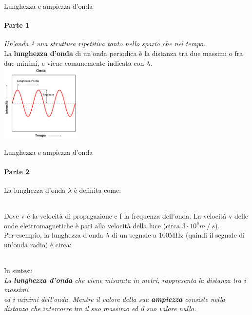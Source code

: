 \documentclass[aspectratio=169]{beamer}
\newcommand*{\vet}{\fontfamily{qzc}\selectfont}
\begin{document}
\begin{frame}{Lunghezza e ampiezza d'onda}
	\framesubtitle{Parte 1}
	\emph{Un'onda è una struttura ripetitiva tanto nello spazio che nel tempo.}\\
	\smallskip
	La \textbf{lunghezza d'onda} di un'onda periodica è la distanza tra due massimi o fra due minimi, e viene comunemente indicata con $\lambda$.\\
	\centering
	\includegraphics[width=0.3\textwidth]{Imgs/Onda}
\end{frame}

\begin{frame}{Lunghezza e ampiezza d'onda}
	\framesubtitle{Parte 2}
	La lunghezza d'onda $\lambda$ è definita come:\\
	\medskip
	\centering{$\lambda = \frac{{\vet v}}{{\vet f}}$}\\
	\smallskip
	\raggedright{Dove {\vet v} è la velocità di propagazione e {\vet f} la frequenza dell'onda. La velocità {\vet v} delle onde elettromagnetiche è pari alla velocità della luce (circa $3 \cdot 10^8 m\mathbin{/}s$)}.\\
	\medskip
	Per esempio, la lunghezza d'onda $\lambda$ di un segnale a 100MHz (quindi il segnale di un'onda radio) è circa:\\
	\medskip
	\\
	\medskip
	\raggedright{In sintesi:}\\
	\emph{La \textbf{lunghezza d'onda} che viene misurata in metri, rappresenta la distanza tra i massimi \\ed i minimi dell'onda. Mentre il valore della sua \textbf{ampiezza} consiste nella distanza che intercorre tra il suo massimo ed il suo valore nullo.}
\end{frame}
\end{document}
